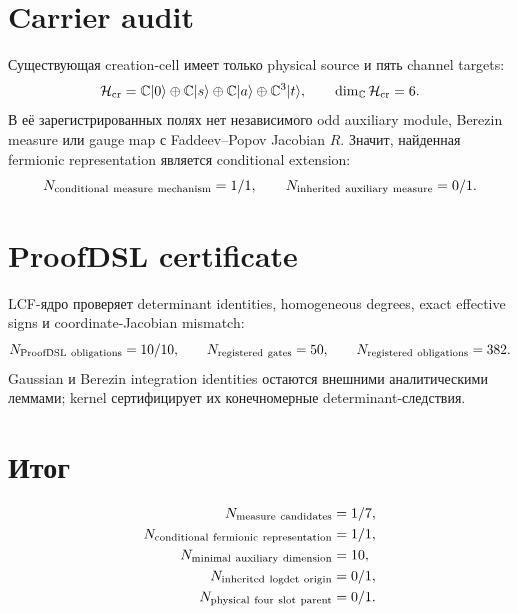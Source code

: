 \section{Carrier audit}

Существующая creation-cell имеет только physical source и пять channel
targets:
\begin{equation}
 \mathcal H_{\rm cr}
 =\mathbb C|0\rangle\oplus
 \mathbb C|s\rangle\oplus\mathbb C|a\rangle\oplus\mathbb C^3|t\rangle,
 \qquad \dim_{\mathbb C}\mathcal H_{\rm cr}=6.
 \label{eq:v9-kms-logdet-measure-creation-cell}
\end{equation}
В её зарегистрированных полях нет независимого odd auxiliary module,
Berezin measure или gauge map с Faddeev--Popov Jacobian $R$. Значит,
найденная fermionic representation является conditional extension:
\begin{equation}
 N_{\rm conditional\ measure\ mechanism}=1/1,
 \qquad
 N_{\rm inherited\ auxiliary\ measure}=0/1.
 \label{eq:v9-kms-logdet-measure-carrier-ledger}
\end{equation}

\section{ProofDSL certificate}

LCF-ядро проверяет determinant identities, homogeneous degrees, exact
effective signs и coordinate-Jacobian mismatch:
\begin{equation}
 N_{\rm ProofDSL\ obligations}=10/10,
 \qquad
 N_{\rm registered\ gates}=50,
 \qquad
 N_{\rm registered\ obligations}=382.
 \label{eq:v9-kms-logdet-measure-proofdsl}
\end{equation}
Gaussian и Berezin integration identities остаются внешними аналитическими
леммами; kernel сертифицирует их конечномерные determinant-следствия.

\section{Итог}

\begin{equation}
 \begin{aligned}
 N_{\rm measure\ candidates}&=1/7,\\
 N_{\rm conditional\ fermionic\ representation}&=1/1,\\
 N_{\rm minimal\ auxiliary\ dimension}&=10,\\
 N_{\rm inherited\ logdet\ origin}&=0/1,\\
 N_{\rm physical\ four\ slot\ parent}&=0/1.
 \end{aligned}
 \label{eq:v9-kms-logdet-measure-final-ledger}
\end{equation}

